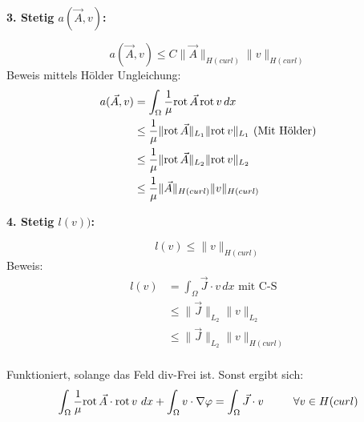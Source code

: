 \textbf{3. Stetig $a(\vec{A},v)$:}\par
\begin{equation}
	a(\vec{A},v) \leq C\|\vec{A}\|_{H(curl)}\|v\|_{H(curl)}
\end{equation}
Beweis mittels H\"older Ungleichung:
\begin{align}
	a(\vec{A},v) &= \int_\Omega \frac{1}{\mu} \mathrm{rot}\,\vec{A}\,\mathrm{rot}\, v\,dx \\
	 &\leq \frac{1}{\mu}\|\mathrm{rot}\,\vec{A}\|_{L_1}\|\mathrm{rot}\, v\|_{L_1} \textrm{  (Mit H\"older)} \\
	 &\leq \frac{1}{\mu}\|\mathrm{rot}\,\vec{A}\|_{L_2}\|\mathrm{rot}\, v\|_{L_2} \\
	 &\leq \frac{1}{\mu}\|\vec{A}\|_{H(curl)}\|v\|_{H(curl)} \\
\end{align}



\textbf{4. Stetig $l(v))$:}\par
\begin{equation}
	l(v) \leq \|v\|_{H(curl)}
\end{equation}
Beweis:
\begin{align}
	l(v) &= \int_\Omega \vec{J}\cdot v\,dx \textrm{   mit C-S}\\
	&\leq \|\vec{J}\|_{L_2} \|v\|_{L_2}\\
	&\leq \|\vec{J}\|_{L_2} \|v\|_{H(curl)}\\
\end{align}

Funktioniert, solange das Feld div-Frei ist. Sonst ergibt sich:
\begin{equation}
	\int_\Omega \frac{1}{\mu}\mathrm{rot}\, \vec{A} \cdot \mathrm{rot}\, v ~dx + \int_\Omega v\cdot\nabla\varphi = \int_\Omega \vec{J}\cdot v ~~~~~~~~\forall v \in H(curl)
\end{equation}